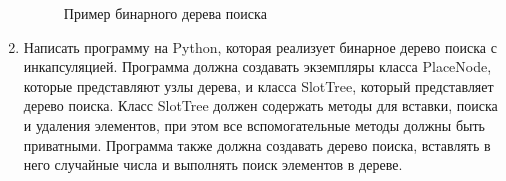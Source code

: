 \begin{enumerate}
\begin{figure}[h]
\centering
{}
\caption{Пример бинарного дерева поиска}
\end{figure}

\item Написать программу на Python, которая реализует бинарное дерево поиска с инкапсуляцией. Программа должна создавать экземпляры класса PlaceNode, которые представляют узлы дерева, и класса SlotTree, который представляет дерево поиска. Класс SlotTree должен содержать методы для вставки, поиска и удаления элементов, при этом все вспомогательные методы должны быть приватными. Программа также должна создавать дерево поиска, вставлять в него случайные числа и выполнять поиск элементов в дереве.


\end{enumerate}
